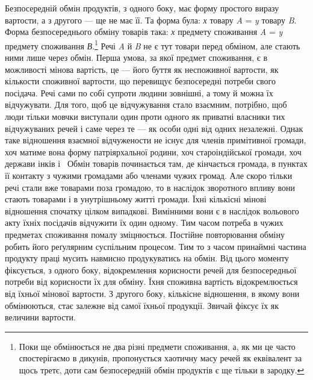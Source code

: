 Безпосередній обмін продуктів, з одного боку, має форму
простого виразу вартости, а з другого — ще не має її. Та форма
була: \emph{х} товару \emph{A} = \emph{y} товару \emph{B}. Форма безпосереднього обміну
товарів така: \emph{х} предмету споживання \emph{A} = \emph{y} предмету споживання
\emph{В}.\footnote{
Поки ще обмінюється не два різні предмети споживання, а, як
ми це часто спостерігаємо в дикунів, пропонується хаотичну масу речей
як еквівалент за щось третє, доти сам безпосередній обмін продуктів є
ще тільки в зародку.
} Речі \emph{A} й \emph{B} не є тут товари перед обміном, але стають ними
лише через обмін. Перша умова, за якої предмет споживання,
є в можливості мінова вартість, це — його буття як неспоживної
вартости, як кількости споживної вартости, що перевищує
безпосередні потреби свого посідача. Речі сами по собі супроти
людини зовнішні, а тому й можна їх відчужувати. Для того,
щоб це відчужування стало взаємним, потрібно, щоб люди тільки
мовчки виступали один проти одного як приватні власники тих
відчужуваних речей і саме через те — як особи одні від одних
незалежні. Однак таке відношення взаємної відчужености не
існує для членів примітивної громади, хоч матиме вона форму
патріярхальної родини, хоч староіндійської громади, хоч держави
інків і~ Обмін товарів починається там, де кінчається
громада, в пунктах її контакту з чужими громадами або членами
чужих громад. Але скоро тільки речі стали вже товарами поза
громадою, то в наслідок зворотного впливу вони стають товарами
і в унутрішньому житті громади. Їхні кількісні мінові відношення
спочатку цілком випадкові. Вимінними вони є в наслідок
вольового акту їхніх посідачів відчужити їх один одному. Тим часом
потреба в чужих предметах споживання помалу зміцнюється.
Постійне повторювання обміну робить його реґулярним
суспільним процесом. Тим то з часом принаймні частина продукту
праці мусить навмисно продукуватись на обмін. Від цього моменту
фіксується, з одного боку, відокремлення корисности речей
для безпосередньої потреби від корисности їх для обміну. Їхня
споживна вартість відокремлюється від їхньої мінової вартости.
З другого боку, кількісне відношення, в якому вони обмінюються,
стає залежне від самої їхньої продукції. Звичай фіксує їх як
величини вартости.

